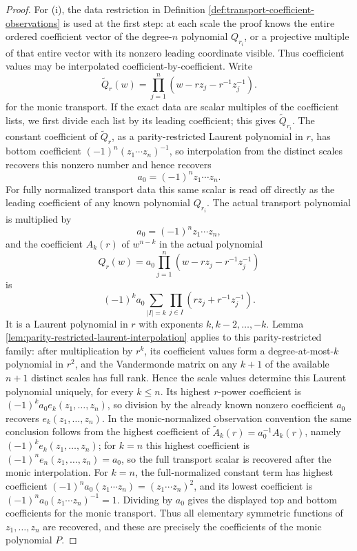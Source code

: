\begin{proof}
For (i), the data restriction in Definition \ref{def:transport-coefficient-observations} is used at the first step: at each scale the proof knows the entire ordered coefficient vector of the degree-\(n\) polynomial \(Q_{r_i}\), or a projective multiple of that entire vector with its nonzero leading coordinate visible.  Thus coefficient values may be interpolated coefficient-by-coefficient.  Write
\[
\widetilde Q_r(w)=\prod_{j=1}^{n}(w-rz_j-r^{-1}z_j^{-1}).
\]
for the monic transport.  If the exact data are scalar multiples of the coefficient lists, we first divide each list by its leading coefficient; this gives \(\widetilde Q_{r_i}\).  The constant coefficient of \(\widetilde Q_r\), as a parity-restricted Laurent polynomial in \(r\), has bottom coefficient \((-1)^n(z_1\cdots z_n)^{-1}\), so interpolation from the distinct scales recovers this nonzero number and hence recovers
\[
a_0=(-1)^n z_1\cdots z_n.
\]
For fully normalized transport data this same scalar is read off directly as the leading coefficient of any known polynomial \(Q_{r_i}\).  The actual transport polynomial is multiplied by
\[
a_0=(-1)^n z_1\cdots z_n,
\]
and the coefficient \(A_k(r)\) of \(w^{n-k}\) in the actual polynomial
\[
Q_r(w)=a_0\prod_{j=1}^{n}(w-rz_j-r^{-1}z_j^{-1})
\]
is
\[
(-1)^k a_0\sum_{|I|=k}\prod_{j\in I}(rz_j+r^{-1}z_j^{-1}).
\]
It is a Laurent polynomial in \(r\) with exponents \(k,k-2,\dots,-k\).  Lemma \ref{lem:parity-restricted-laurent-interpolation} applies to this parity-restricted family: after multiplication by \(r^k\), its coefficient values form a degree-at-most-\(k\) polynomial in \(r^2\), and the Vandermonde matrix on any \(k+1\) of the available \(n+1\) distinct scales has full rank.  Hence the scale values determine this Laurent polynomial uniquely, for every \(k\le n\).  Its highest \(r\)-power coefficient is \((-1)^k a_0 e_k(z_1,\dots,z_n)\), so division by the already known nonzero coefficient \(a_0\) recovers \(e_k(z_1,
\dots,z_n)\).  In the monic-normalized observation convention the same conclusion follows from the highest coefficient of \(\widetilde A_k(r)=a_0^{-1}A_k(r)\), namely \((-1)^ke_k(z_1,\dots,z_n)\); for \(k=n\) this highest coefficient is \((-1)^ne_n(z_1,\dots,z_n)=a_0\), so the full transport scalar is recovered after the monic interpolation.  For \(k=n\), the full-normalized constant term has highest coefficient \((-1)^n a_0(z_1\cdots z_n)=(z_1\cdots z_n)^2\), and its lowest coefficient is \((-1)^n a_0(z_1\cdots z_n)^{-1}=1\).  Dividing by \(a_0\) gives the displayed top and bottom coefficients for the monic transport.  Thus all elementary symmetric functions of \(z_1,
\dots,z_n\) are recovered, and these are precisely the coefficients of the monic polynomial \(P\).


\end{proof}
